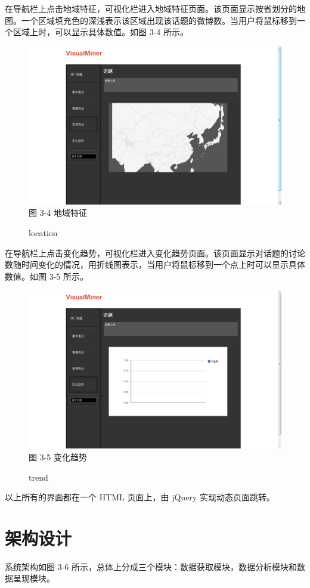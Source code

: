 在导航栏上点击地域特征，可视化栏进入地域特征页面。该页面显示按省划分的地图。一个区域填充色的深浅表示该区域出现该话题的微博数。当用户将鼠标移到一个区域上时，可以显示具体数值。如图 3-4 所示。
\begin{figure}[!h]
\centering
\includegraphics[width=\textwidth, height=0.37\textheight]{web_location}
图 3-4 地域特征
\caption{location}
\end{figure}


在导航栏上点击变化趋势，可视化栏进入变化趋势页面。该页面显示对话题的讨论数随时间变化的情况，用折线图表示，当用户将鼠标移到一个点上时可以显示具体数值。如图 3-5 所示。
\begin{figure}[!h]
\centering
\includegraphics[width=\textwidth, height=0.37\textheight]{web_time}
图 3-5 变化趋势
\caption{trend}
\end{figure}

以上所有的界面都在一个 HTML 页面上，由 jQuery 实现动态页面跳转。

\section{架构设计}
系统架构如图 3-6 所示，总体上分成三个模块：数据获取模块，数据分析模块和数据呈现模块。

